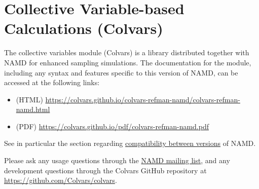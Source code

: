 \section{Collective Variable-based Calculations (Colvars)}
\label{section:colvars}

The collective variables module (Colvars) is a library distributed together with NAMD for enhanced sampling simulations.
The documentation for the module, including any syntax and features specific to this version of NAMD, can be accessed at the following links:
\begin{itemize}
\item (HTML) \url{https://colvars.github.io/colvars-refman-namd/colvars-refman-namd.html}
\item (PDF) \url{https://colvars.github.io/pdf/colvars-refman-namd.pdf}
\end{itemize}
\noindent{}See in particular the section regarding \href{https://colvars.github.io/colvars-refman-namd/colvars-refman-namd.html#sec:colvars_config_changes}{compatibility between versions} of NAMD.
 
Please ask any usage questions through the \href{https://www.ks.uiuc.edu/Research/namd/mailing_list/}{NAMD mailing list}, and any development questions through the Colvars GitHub repository at \url{https://github.com/Colvars/colvars}.
